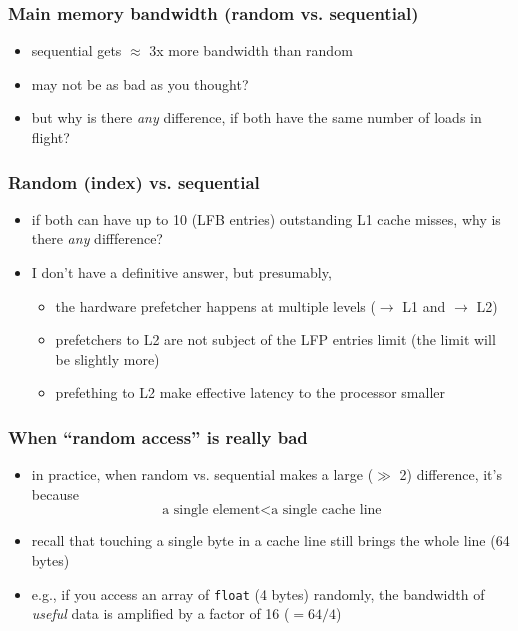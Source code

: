 \documentclass[12pt,dvipdfmx]{beamer}
\newcommand{\ao}[1]{{\color{blue}#1}}
\begin{document}
\begin{frame}
\frametitle{Main memory bandwidth (random vs. sequential)}
\begin{itemize}
\item sequential gets $\approx$ 3x more bandwidth than random
\item may not be as bad as you thought?
\item but why is there \ao{\emph{any}} difference, 
  if both have the same number of loads in flight?
\end{itemize}
\begin{center}
  {\scriptsize}
\end{center}
\end{frame}

\begin{frame}
\frametitle{Random (index) vs. sequential}
\begin{itemize}
\item if both can have up to 10 (LFB entries)
  outstanding L1 cache misses, why is there \ao{\it any} diffference?
  
\item I don't have a definitive answer, but presumably,
  \begin{itemize}
  \item the hardware prefetcher happens at multiple levels
    ($\rightarrow$ L1 and $\rightarrow$ L2)
  \item prefetchers to L2 are not subject of the LFP entries limit
    (the limit will be slightly more)
  \item prefething to L2 make effective latency to the processor smaller
  \end{itemize}
\end{itemize}
\end{frame}

\begin{frame}
\frametitle{When ``random access'' is really bad}
\begin{itemize}
\item in practice, when random vs. sequential makes a large ($\gg$ 2) 
difference, it's because 
\[ \mbox{a single element} < \mbox{a single cache line} \]

\item recall that touching a single byte in a cache line still 
  brings the whole line (64 bytes)

\item e.g., if you access an array of \texttt{float} (4 bytes) randomly,
  the bandwidth of \ao{\emph{useful}} data 
  is amplified by a factor of 16 ($= 64/4$)
\end{itemize}
\end{frame}
\end{document}

